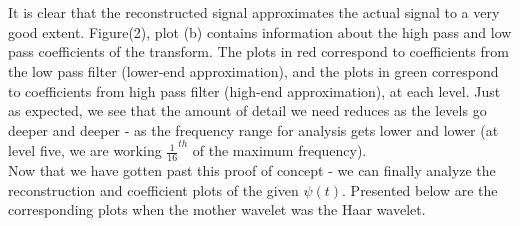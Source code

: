 \documentclass[12pt]{article}
\begin{document}
\\\\
\indent \newpage It is clear that the reconstructed signal approximates the actual signal to a very good extent. Figure(2), plot (b) contains information about the high pass and low pass coefficients of the transform. The plots in red correspond to coefficients from the low pass filter (lower-end approximation), and the plots in green correspond to coefficients from high pass filter (high-end approximation), at each level. Just as expected, we see that the amount of detail we need reduces as the levels go deeper and deeper - as the frequency range for analysis gets lower and lower (at level five, we are working $\frac{1}{16}^{th}$ of the maximum frequency). \\
\indent Now that we have gotten past this proof of concept - we can finally analyze the reconstruction and coefficient plots of the given $\psi(t)$. Presented below are the corresponding plots when the mother wavelet was the Haar wavelet.  
\end{document}
